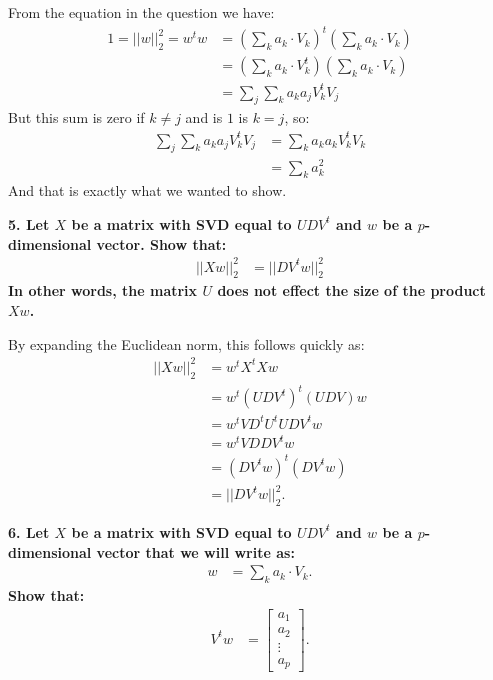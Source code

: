 \documentclass[12pt,hidelinks]{article}
\numberwithin{equation}{section}
\begin{document}
From the equation in the question we have:
\begin{align}
1 = || w ||_2^2 = w^t w &= \left(\sum_k a_k \cdot V_k \right)^t \left(\sum_k a_k \cdot V_k \right) \\
&= \left(\sum_k a_k \cdot V_k^t \right) \left(\sum_k a_k \cdot V_k \right) \\
&= \sum_j \sum_k a_k a_j V_k^t V_j
\end{align}
But this sum is zero if $k\neq j$ and is $1$ is $k=j$, so:
\begin{align}
\sum_j \sum_k a_k a_j V_k^t V_j &= \sum_k a_k a_k V_k^t V_k \\
&= \sum_k a_k^2
\end{align}
And that is exactly what we wanted to show.

\vspace*{12pt}

\textbf{5. Let $X$ be a matrix with SVD equal to $UDV^t$ and $w$ be a
$p$-dimensional vector. Show that:
\begin{align}
|| X w ||_2^2 &= || D V^t w ||_2^2
\end{align}
In other words, the matrix $U$ does not effect the size of the product $X w$.}

\vspace*{12pt}

By expanding the Euclidean norm, this follows quickly as:
\begin{align}
|| X w ||_2^2 &= w^t X^t X w\\
&= w^t (U D V^t)^t (U D V) w \\
&= w^t V D^t U^t U D V^t w \\
&= w^t V D D V^t w \\
&= (D V^t w)^t (D V^t w) \\
&= ||D V^t w ||_2^2.
\end{align}

\vspace*{12pt}

\textbf{6. Let $X$ be a matrix with SVD equal to $UDV^t$ and $w$ be a
$p$-dimensional vector that we will write as:}
\begin{align}
w &= \sum_k a_k \cdot V_k.
\end{align}
\textbf{Show that:}
\begin{align}
V^t w &= \begin{bmatrix} a_1 \\ a_2 \\ \vdots \\ a_p \end{bmatrix}.
\end{align}
\end{document}
